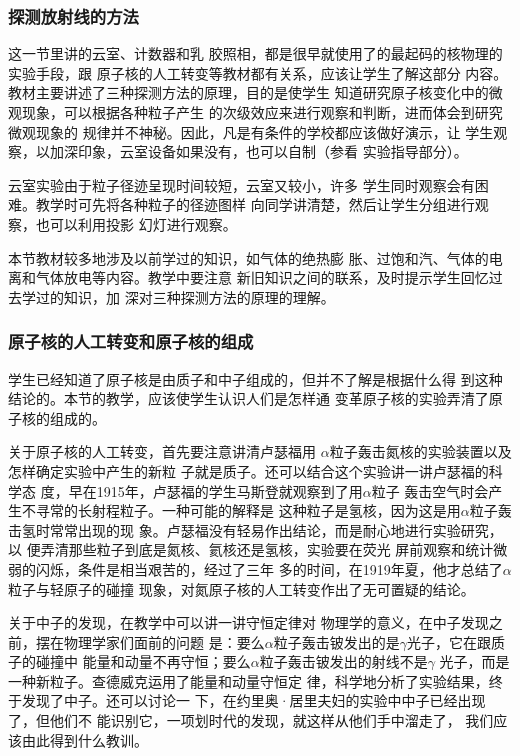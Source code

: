 \subsubsection{探测放射线的方法}

这一节里讲的云室、计数器和乳
胶照相，都是很早就使用了的最起码的核物理的实验手段，跟
原子核的人工转变等教材都有关系，应该让学生了解这部分
内容。教材主要讲述了三种探测方法的原理，目的是使学生
知道研究原子核变化中的微观现象，可以根据各种粒子产生
的次级效应来进行观察和判断，进而体会到研究微观现象的
规律并不神秘。因此，凡是有条件的学校都应该做好演示，让
学生观察，以加深印象，云室设备如果没有，也可以自制（参看
实验指导部分）。

云室实验由于粒子径迹呈现时间较短，云室又较小，许多
学生同时观察会有困难。教学时可先将各种粒子的径迹图样
向同学讲清楚，然后让学生分组进行观察，也可以利用投影
幻灯进行观察。

本节教材较多地涉及以前学过的知识，如气体的绝热膨
胀、过饱和汽、气体的电离和气体放电等内容。教学中要注意
新旧知识之间的联系，及时提示学生回忆过去学过的知识，加
深对三种探测方法的原理的理解。

\subsubsection{原子核的人工转变和原子核的组成}
学生已经知道了原子核是由质子和中子组成的，但并不了解是根据什么得
到这种结论的。本节的教学，应该使学生认识人们是怎样通
变革原子核的实验弄清了原子核的组成的。

关于原子核的人工转变，首先要注意讲清卢瑟福用
$\alpha$粒子轰击氮核的实验装置以及怎样确定实验中产生的新粒
子就是质子。还可以结合这个实验讲一讲卢瑟福的科学态
度，早在1915年，卢瑟福的学生马斯登就观察到了用$\alpha$粒子
轰击空气时会产生不寻常的长射程粒子。一种可能的解释是
这种粒子是氢核，因为这是用$\alpha$粒子轰击氢时常常出现的现
象。卢瑟福没有轻易作出结论，而是耐心地进行实验研究，以
便弄清那些粒子到底是氮核、氦核还是氢核，实验要在荧光
屏前观察和统计微弱的闪烁，条件是相当艰苦的，经过了三年
多的时间，在1919年夏，他才总结了$\alpha$粒子与轻原子的碰撞
现象，对氮原子核的人工转变作出了无可置疑的结论。

关于中子的发现，在教学中可以讲一讲守恒定律对
物理学的意义，在中子发现之前，摆在物理学家们面前的问题
是：要么$\alpha$粒子轰击铍发出的是$\gamma$光子，它在跟质子的碰撞中
能量和动量不再守恒；要么$\alpha$粒子轰击铍发出的射线不是$\gamma$
光子，而是一种新粒子。查德威克运用了能量和动量守恒定
律，科学地分析了实验结果，终于发现了中子。还可以讨论一
下，在约里奥·居里夫妇的实验中中子已经出现了，但他们不
能识别它，一项划时代的发现，就这样从他们手中溜走了，
我们应该由此得到什么教训。

